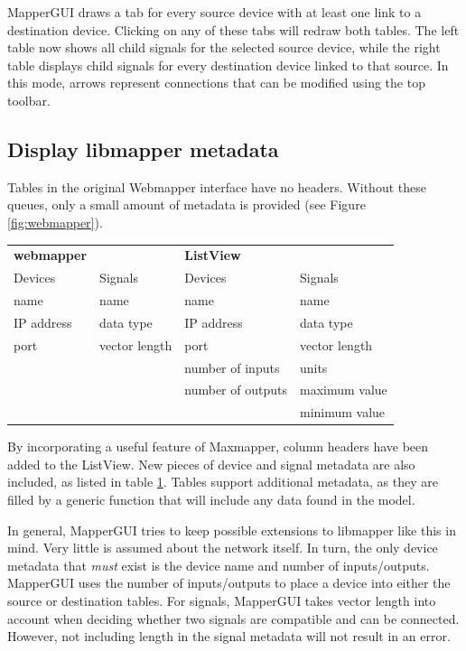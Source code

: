 MapperGUI draws a tab for every source device with at least one link to a destination device. Clicking on any of these tabs will redraw both tables. The left table now shows all child signals for the selected source device, while the right table displays child signals for every destination device linked to that source. In this mode, arrows represent connections that can be modified using the top toolbar.

	
	\subsection{Display libmapper metadata} %
	\label{sub:display_libmapper_metadata}

Tables in the original Webmapper interface have no headers. Without these queues, only a small amount of metadata is provided (see Figure \ref{fig:webmapper}).

\begin{table}
	\centering
	\label{tab:webmapper_list_view_metadata}
		\begin{tabular}{l  l  |  l l }
		\hline\hline
		\textbf{webmapper}&&\textbf{ListView}\\
		Devices&Signals&Devices&Signals\\
		\hline
		name&name&name&name\\
		IP address&data type&IP address&data type\\
		port&vector length&port&vector length\\
		&&number of inputs&units\\
		&&number of outputs&maximum value\\
		&&&minimum value\\
		\end{tabular}
\end{table}

By incorporating a useful feature of Maxmapper, column headers have been added to the ListView. New pieces of device and signal metadata are also included, as listed in table \ref{tab:webmapper_list_view_metadata}. Tables support additional metadata, as they are filled by a generic function that will include any data found in the model. 

In general, MapperGUI tries to keep possible extensions to libmapper like this in mind. Very little is assumed about the network itself. In turn, the only device metadata that \emph{must} exist is the device name and number of inputs/outputs. MapperGUI uses the number of inputs/outputs to place a device into either the source or destination tables. For signals, MapperGUI takes vector length into account when deciding whether two signals are compatible and can be connected. However, not including length in the signal metadata will not result in an error.
	
